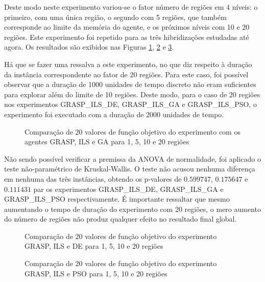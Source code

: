 Deste modo neste experimento variou-se o fator número de regiões em 4 níveis: o primeiro, com uma única região, o segundo com 5 regiões, que também corresponde ao limite da memória do agente, e os próximos níveis com 10 e 20 regiões. Este experimento foi repetido para as três hibridizações estudadas até agora. Os resultados são exibidos nas Figuras \ref{fig:A0boxplot}, \ref{fig:A1boxplot} e \ref{fig:A2boxplot}. 

Há que se fazer uma ressalva a este experimento, no que diz respeito à duração da instância correspondente ao fator de 20 regiões. Para este caso, foi possível observar que a duração de 1000 unidades de tempo discreto não eram suficientes para explorar além do limite de 10 regiões. Deste modo, para o caso de 20 regiões nos experimentos GRASP\_ILS\_DE,  GRASP\_ILS\_GA e GRASP\_ILS\_PSO, o experimento foi executado com a duração de 2000 unidades de tempo. 

\begin{figure}
    \centering
    
    \caption{Comparação de 20 valores de função objetivo do experimento com os agentes GRASP, ILS e GA para 1, 5, 10 e 20 regiões}
    \label{fig:A0boxplot}
\end{figure}

Não sendo possível verificar a premissa da ANOVA de normalidade, foi aplicado o teste não-paramétrico de Kruskal-Wallis. O teste não acusou nenhuma diferença em nenhuma das três instâncias, obtendo os p-valores de $0.599747$, $0.175647$ e $0.111431$ par os experimentos GRASP\_ILS\_DE, GRASP\_ILS\_GA e GRASP\_ILS\_PSO respectivamente. É importante ressaltar que mesmo aumentando o tempo de duração do experimento com 20 regiões, o mero aumento do número de regiões não produz qualquer efeito no resultado final global. 

\begin{figure}
    \centering
    
    \caption{Comparação de 20 valores de função objetivo do experimento GRASP, ILS e DE para 1, 5, 10 e 20 regiões}
    \label{fig:A1boxplot}
\end{figure}

\begin{figure}
    \centering
    
    \caption{Comparação de 20 valores de função objetivo do experimento GRASP, ILS e PSO para 1, 5, 10 e 20 regiões}
    \label{fig:A2boxplot}
\end{figure}

